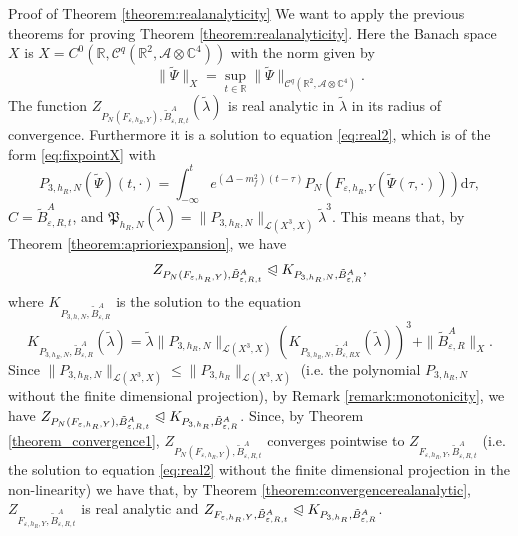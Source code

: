 \documentclass{article}
\newcommand{\mathd}{\mathrm{d}}
\newenvironment{proof*}[1]{\noindent\textbf{#1\ }}{\hspace*{\fill}$\Box$\medskip}
\begin{document}
\begin{proof*}{Proof of Theorem \ref{theorem:realanalyticity}}
  We want to apply the previous theorems for proving Theorem
  \ref{theorem:realanalyticity}. Here the Banach space $X$ is $X = C^0
  (\mathbb{R}, \mathcal{C}^q (\mathbb{R}^2, \mathcal{A} \otimes
  \mathbb{C}^4))$ with the norm given by
  \[ \| \tilde{\Psi} \|_X = \sup_{t \in \mathbb{R}} \| \tilde{\Psi}
     \|_{\mathcal{C}^q (\mathbb{R}^2, \mathcal{A} \otimes \mathbb{C}^4)} . \]
  The function $Z_{P_N (F_{\varepsilon, h_R, Y}), \tilde{B}^A_{\varepsilon, R,
  t}} (\tilde{\lambda})_{}$ is real analytic in $\tilde{\lambda}$ in its
  radius of convergence. Furthermore it is a solution to equation
  {\eqref{eq:real2}}, which is of the form {\eqref{eq:fixpointX}} with
  \begin{equation}
    P_{3, h_R, N} (\tilde{\Psi}) (t, \cdot) = \int_{- \infty}^t e^{(\Delta -
    m_f^2) (t - \tau)} P_N (F_{\varepsilon, h_R, Y} (\tilde{\Psi} (\tau,
    \cdot))) \mathd \tau, \label{eq:P3etc}
  \end{equation}
  $C = \tilde{B}^A_{\varepsilon, R, t}$, and $\mathfrak{P}_{h_R, N}
  (\tilde{\lambda}) = \| P_{3, h_R, N} \|_{\mathcal{L} (X^3, X)}
  \tilde{\lambda}^3$. This means that, by Theorem
  \ref{theorem:aprioriexpansion}, we have \[Z_{P_N (F_{\varepsilon, h_R, Y}),
  \tilde{B}^A_{\varepsilon, R, t}} \trianglelefteqslant K_{P_{3, h_R, N},
  \tilde{B}^A_{\varepsilon, R}},\] where $K_{P_{3, h, N},
  \tilde{B}^A_{\varepsilon, R}}$ is the solution to the equation \[K_{P_{3,
  h_R, N}, \tilde{B}^A_{\varepsilon, R}} (\tilde{\lambda}) = \tilde{\lambda}
  \| P_{3, h_R, N} \|_{\mathcal{L} (X^3, X)} \left( K_{P_{3, h_R, N},
  \tilde{B}^A_{\varepsilon, R X}} (\tilde{\lambda}) \right)^3 + \|
  \tilde{B}^A_{\varepsilon, R} \|_X .\] 
  Since $\| P_{3, h_R, N} \|_{\mathcal{L}
  (X^3, X)} \leqslant \| P_{3, h_R} \|_{\mathcal{L} (X^3, X)}$ (i.e. the
  polynomial $P_{3, h_R, N}$ without the finite dimensional projection), by
  Remark \ref{remark:monotonicity}, we have $Z_{P_N (F_{\varepsilon, h_R, Y}),
  \tilde{B}^A_{\varepsilon, R, t}} \trianglelefteqslant K_{P_{3, h_R},
  \tilde{B}^A_{\varepsilon, R}}$. Since, by Theorem
  \ref{theorem_convergence1}, $Z_{P_N (F_{\varepsilon, h_R, Y}),
  \tilde{B}^A_{\varepsilon, R, t}}$ converges pointwise to $Z_{F_{\varepsilon,
  h_R, Y}, \tilde{B}^A_{\varepsilon, R, t}}$ (i.e. the solution to equation
  {\eqref{eq:real2}} without the finite dimensional projection in the
  non-linearity) we have that, by Theorem
  \ref{theorem:convergencerealanalytic}, $Z_{F_{\varepsilon, h_R, Y},
  \tilde{B}^A_{\varepsilon, R, t}}$ is real analytic and $Z_{F_{\varepsilon,
  h_R, Y}, \tilde{B}^A_{\varepsilon, R, t}} \trianglelefteqslant K_{P_{3,
  h_R}, \tilde{B}^A_{\varepsilon, R}}$.
  

\end{proof*}
\end{document}
